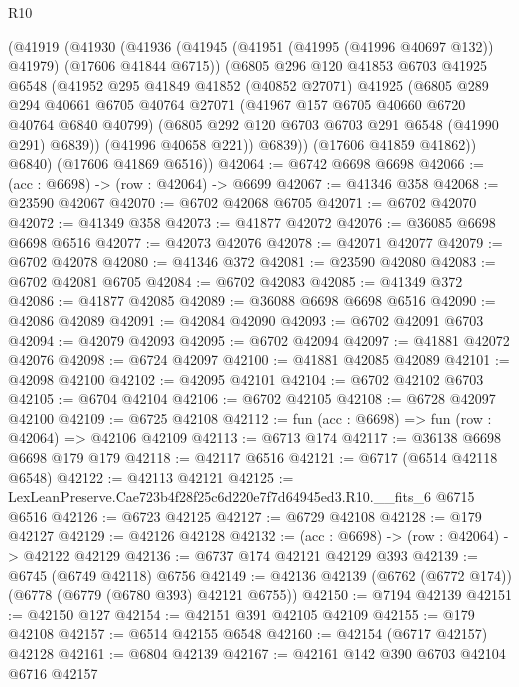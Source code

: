 \begin{lexlean}{R10}
\begin{coremodule}
      (@41919
        (@41930
          (@41936
            (@41945 (@41951 (@41995 (@41996 @40697 @132)) @41979) (@17606 @41844 @6715))
            (@6805
              @296
              @120
              @41853
              @6703
              @41925
              @6548
              (@41952
                @295
                @41849
                @41852
                (@40852 @27071)
                @41925
                (@6805
                  @289
                  @294
                  @40661
                  @6705
                  @40764
                  @27071
                  (@41967 @157 @6705 @40660 @6720 @40764 @6840 @40799)
                  (@6805 @292 @120 @6703 @6703 @291 @6548 (@41990 @291) @6839))
                (@41996 @40658 @221))
              @6839))
          (@17606 @41859 @41862))
        @6840)
      (@17606 @41869 @6516))
@42064 := @6742 @6698 @6698
@42066 := (acc : @6698) -> (row : @42064) -> @6699
@42067 := @41346 @358
@42068 := @23590 @42067
@42070 := @6702 @42068 @6705
@42071 := @6702 @42070
@42072 := @41349 @358
@42073 := @41877 @42072
@42076 := @36085 @6698 @6698 @6516
@42077 := @42073 @42076
@42078 := @42071 @42077
@42079 := @6702 @42078
@42080 := @41346 @372
@42081 := @23590 @42080
@42083 := @6702 @42081 @6705
@42084 := @6702 @42083
@42085 := @41349 @372
@42086 := @41877 @42085
@42089 := @36088 @6698 @6698 @6516
@42090 := @42086 @42089
@42091 := @42084 @42090
@42093 := @6702 @42091 @6703
@42094 := @42079 @42093
@42095 := @6702 @42094
@42097 := @41881 @42072 @42076
@42098 := @6724 @42097
@42100 := @41881 @42085 @42089
@42101 := @42098 @42100
@42102 := @42095 @42101
@42104 := @6702 @42102 @6703
@42105 := @6704 @42104
@42106 := @6702 @42105
@42108 := @6728 @42097 @42100
@42109 := @6725 @42108
@42112 := fun (acc : @6698) => fun (row : @42064) => @42106 @42109
@42113 := @6713 @174
@42117 := @36138 @6698 @6698 @179 @179
@42118 := @42117 @6516
@42121 := @6717 (@6514 @42118 @6548)
@42122 := @42113 @42121
@42125 := LexLeanPreserve.Cae723b4f28f25c6d220e7f7d64945ed3.R10.__fits_6 @6715 @6516
@42126 := @6723 @42125
@42127 := @6729 @42108
@42128 := @179 @42127
@42129 := @42126 @42128
@42132 := (acc : @6698) -> (row : @42064) -> @42122 @42129
@42136 := @6737 @174 @42121 @42129 @393
@42139 := @6745 (@6749 @42118) @6756
@42149 := @42136 @42139 (@6762 (@6772 @174)) (@6778 (@6779 (@6780 @393) @42121 @6755))
@42150 := @7194 @42139
@42151 := @42150 @127
@42154 := @42151 @391 @42105 @42109
@42155 := @179 @42108
@42157 := @6514 @42155 @6548
@42160 := @42154 (@6717 @42157) @42128
@42161 := @6804 @42139
@42167 := @42161 @142 @390 @6703 @42104 @6716 @42157

\end{coremodule}
\end{lexlean}
